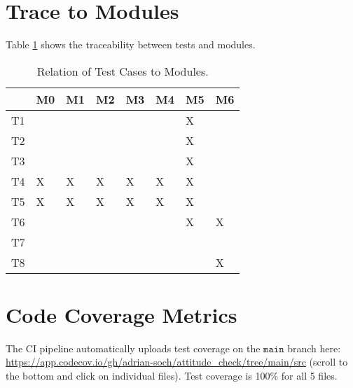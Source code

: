 \documentclass[12pt, titlepage]{article}
\begin{document}
\section{Trace to Modules}

Table \ref{tab:mod_trace} shows the traceability between tests and modules.

\begin{table}[H]
  \centering
  \caption{Relation of Test Cases to Modules.}
  \vspace{2mm}
  \label{tab:mod_trace}
  \begin{tabular}{|l|l|l|l|l|l|l|l|}
  \hline
     & M0 & M1 & M2 & M3 & M4 & M5 & M6 \\ \hline
  T1 &    &    &    &    &    & X  &    \\ \hline
  T2 &    &    &    &    &    & X  &    \\ \hline
  T3 &    &    &    &    &    & X  &    \\ \hline
  T4 & X  & X  & X  & X  & X  & X  &    \\ \hline
  T5 & X  & X  & X  & X  & X  & X  &    \\ \hline
  T6 &    &    &    &    &    & X  & X  \\ \hline
  T7 &    &    &    &    &    &    &    \\ \hline
  T8 &    &    &    &    &    &    & X  \\ \hline
  \end{tabular}
  \end{table}

\section{Code Coverage Metrics}

The CI pipeline automatically uploads test coverage on the $\mathtt{main}$ branch here:
\url{https://app.codecov.io/gh/adrian-soch/attitude_check/tree/main/src} (scroll to the bottom and
click on individual files). Test coverage is 100\% for all 5 files.

% 
% 
\end{document}

